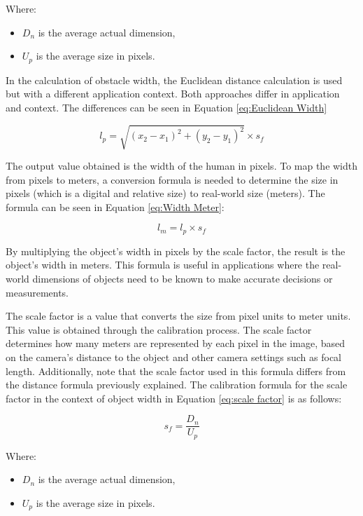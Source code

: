 Where:
\begin{itemize}
\item $D_n$ is the average actual dimension,
\item $U_p$ is the average size in pixels.
\end{itemize}

In the calculation of obstacle width, the Euclidean distance calculation is used but with a different application context. Both approaches differ in application and context. The differences can be seen in Equation \ref{eq:Euclidean Width}

\begin{equation}
\label{eq:Euclidean Width}
l_p = \sqrt{(x_2 - x_1)^2 + (y_2 - y_1)^2} \times s_f
\end{equation}

The output value obtained is the width of the human in pixels. To map the width from pixels to meters, a conversion formula is needed to determine the size in pixels (which is a digital and relative size) to real-world size (meters). The formula can be seen in Equation \ref{eq:Width Meter}:

\begin{equation}
\label{eq:Width Meter}
l_m = l_p \times s_f
\end{equation}

By multiplying the object's width in pixels by the scale factor, the result is the object's width in meters. This formula is useful in applications where the real-world dimensions of objects need to be known to make accurate decisions or measurements.

The scale factor is a value that converts the size from pixel units to meter units. This value is obtained through the calibration process. The scale factor determines how many meters are represented by each pixel in the image, based on the camera's distance to the object and other camera settings such as focal length. Additionally, note that the scale factor used in this formula differs from the distance formula previously explained. The calibration formula for the scale factor in the context of object width in Equation \ref{eq:scale factor} is as follows:

\begin{equation}
\label{eq:scale factor}
s_f = \frac{D_n}{U_p}
\end{equation}

Where:
\begin{itemize}
\item $D_n$ is the average actual dimension,
\item $U_p$ is the average size in pixels.
\end{itemize}

